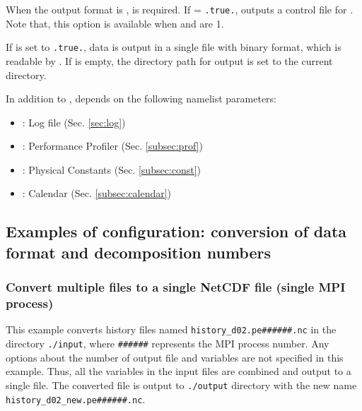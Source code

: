 When the output format is \scalenetcdf,  is required.
If  = \verb|.true.|, \sno outputs a control file for \grads.
Note that, this option is available when  and  are 1.


If  is set to \verb|.true.|, data is output in a single file with binary format, which is readable by \grads.
If  is empty, the directory path for output is set to the current directory.


In addition to , \sno depends on the following namelist parameters:
%
\begin{itemize}
 \item {}: Log file (Sec. \ref{sec:log})
 \item {}: Performance Profiler (Sec. \ref{subsec:prof})
 \item {}: Physical Constants (Sec. \ref{subsec:const})
 \item {}: Calendar (Sec. \ref{subsec:calendar})
\end{itemize}



\subsection{Examples of configuration: conversion of data format and decomposition numbers}

\subsubsection{Convert multiple \scalenetcdf files to a single NetCDF file (single MPI process)}
%
%
This example converts history files named \verb|history_d02.pe######.nc| in the directory \verb|./input|, where \verb|######| represents the MPI process number.
Any options about the number of output file and variables are not specified in this example.
Thus, all the variables in the input files are combined and output to a single file.
The converted file is output to \verb|./output| directory with the new name \verb|history_d02_new.pe######.nc|.

